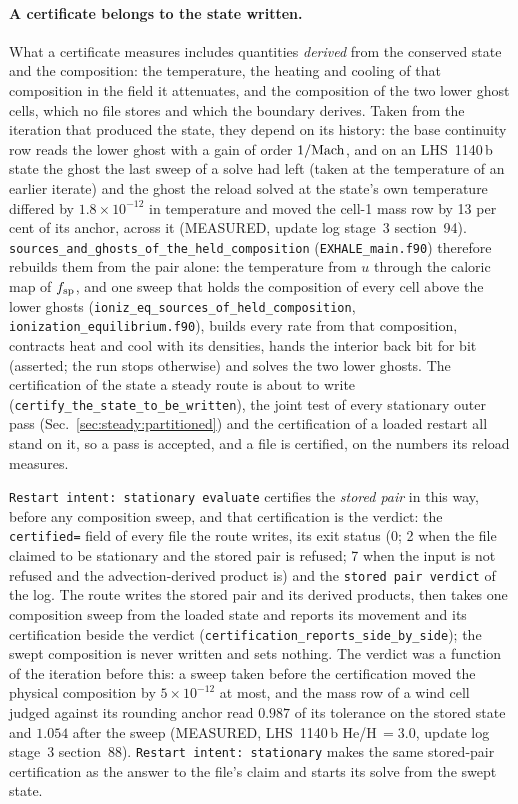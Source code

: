 \paragraph{A certificate belongs to the state written.}
What a certificate measures includes quantities \emph{derived} from the
conserved state and the composition: the temperature, the heating and cooling
of that composition in the field it attenuates, and the composition of the
two lower ghost cells, which no file stores and which the boundary derives.
Taken from the iteration that produced the state, they depend on its
history: the base continuity row reads the lower ghost with a gain of order
$1/{\rm Mach}$, and on an LHS~1140\,b state the ghost the last sweep of a
solve had left (taken at the temperature of an earlier iterate) and the ghost
the reload solved at the state's own temperature differed by
$1.8\times10^{-12}$ in temperature and moved the cell-1 mass row by 13 per
cent of its anchor, across it (MEASURED, update log stage~3 section~94).
\texttt{sources\_and\_ghosts\_of\_the\_held\_composition}
(\texttt{EXHALE\_main.f90}) therefore rebuilds them from the pair alone: the
temperature from $u$ through the caloric map of $f_{\rm sp}$, and one sweep
that holds the composition of every cell above the lower ghosts
(\texttt{ioniz\_eq\_sources\_of\_held\_composition},
\texttt{ionization\_equilibrium.f90}), builds every rate from that
composition, contracts heat and cool with its densities, hands the interior
back bit for bit (asserted; the run stops otherwise) and solves the two
lower ghosts. The certification of the state a steady route is about to write
(\texttt{certify\_the\_state\_to\_be\_written}), the joint test of every
stationary outer pass (Sec.~\ref{sec:steady:partitioned}) and the
certification of a loaded restart all stand on it, so a pass is accepted, and
a file is certified, on the numbers its reload measures.

\texttt{Restart intent: stationary evaluate} certifies the \emph{stored pair}
in this way, before any composition sweep, and that certification is the
verdict: the \texttt{certified=} field of every file the route writes, its
exit status (0; 2 when the file claimed to be stationary and the stored pair
is refused; 7 when the input is not refused and the advection-derived
product is) and the \texttt{stored pair verdict} of the log. The route writes
the stored pair and its derived products, then takes one composition sweep
from the loaded state and reports its movement and its certification beside
the verdict (\texttt{certification\_reports\_side\_by\_side}); the swept
composition is never written and sets nothing.  The verdict was a function of
the iteration before this: a sweep taken before the certification moved the
physical composition by $5\times10^{-12}$ at most, and the mass row of a
wind cell judged against its rounding anchor read $0.987$ of its tolerance on
the stored state and $1.054$ after the sweep (MEASURED, LHS~1140\,b
He/H\,$=3.0$, update log stage~3 section~88).  \texttt{Restart intent:
stationary} makes the same stored-pair certification as the answer to the
file's claim and starts its solve from the swept state.

